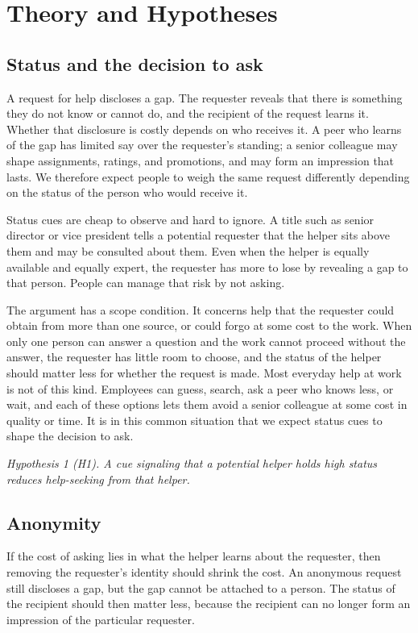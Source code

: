 \documentclass[11pt]{article}
\begin{document}
\section{Theory and Hypotheses}

\subsection{Status and the decision to ask}

A request for help discloses a gap. The requester reveals that there is something they do not know or cannot do, and the recipient of the request learns it. Whether that disclosure is costly depends on who receives it. A peer who learns of the gap has limited say over the requester's standing; a senior colleague may shape assignments, ratings, and promotions, and may form an impression that lasts. We therefore expect people to weigh the same request differently depending on the status of the person who would receive it.

Status cues are cheap to observe and hard to ignore. A title such as senior director or vice president tells a potential requester that the helper sits above them and may be consulted about them. Even when the helper is equally available and equally expert, the requester has more to lose by revealing a gap to that person. People can manage that risk by not asking.

The argument has a scope condition. It concerns help that the requester could obtain from more than one source, or could forgo at some cost to the work. When only one person can answer a question and the work cannot proceed without the answer, the requester has little room to choose, and the status of the helper should matter less for whether the request is made. Most everyday help at work is not of this kind. Employees can guess, search, ask a peer who knows less, or wait, and each of these options lets them avoid a senior colleague at some cost in quality or time. It is in this common situation that we expect status cues to shape the decision to ask.

\textit{Hypothesis 1 (H1). A cue signaling that a potential helper holds high status reduces help-seeking from that helper.}

\subsection{Anonymity}

If the cost of asking lies in what the helper learns about the requester, then removing the requester's identity should shrink the cost. An anonymous request still discloses a gap, but the gap cannot be attached to a person. The status of the recipient should then matter less, because the recipient can no longer form an impression of the particular requester.
\end{document}
